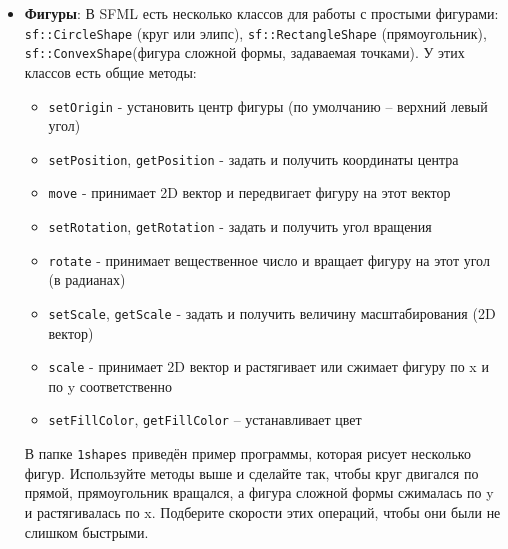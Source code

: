 \documentclass{article}
\begin{document}
\begin{itemize}
\item \textbf{Фигуры}: В SFML есть несколько классов для работы с простыми фигурами: \texttt{sf::CircleShape} (круг или элипс), \texttt{sf::RectangleShape} (прямоугольник), \texttt{sf::ConvexShape}(фигура сложной формы, задаваемая точками). У этих классов есть общие методы:
\begin{itemize}
\item \texttt{setOrigin} - установить центр фигуры (по умолчанию -- верхний левый угол)
\item \texttt{setPosition}, \texttt{getPosition} - задать и получить координаты центра
\item \texttt{move} - принимает 2D вектор и передвигает фигуру на этот вектор
\item \texttt{setRotation}, \texttt{getRotation} - задать и получить угол вращения
\item \texttt{rotate} - принимает вещественное число и вращает фигуру на этот угол (в радианах)
\item \texttt{setScale}, \texttt{getScale} - задать и получить величину масштабирования (2D вектор)
\item \texttt{scale} - принимает  2D вектор и растягивает или сжимает фигуру по x и по y соответственно
\item \texttt{setFillColor}, \texttt{getFillColor} -- устанавливает цвет
\end{itemize}
В папке \texttt{1shapes} приведён пример программы, которая рисует несколько фигур. Используйте методы выше и сделайте так, чтобы круг двигался по прямой, прямоугольник вращался, а фигура сложной формы сжималась по y и растягивалась по x. Подберите скорости этих операций, чтобы они были не слишком быстрыми.


\end{itemize}
\end{document}

